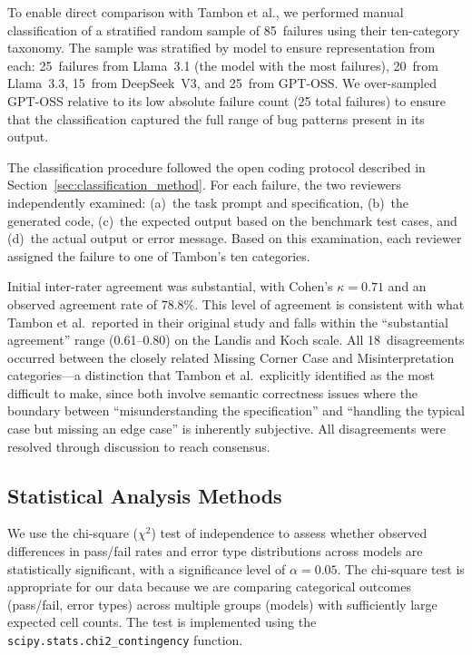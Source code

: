 \documentclass[smallextended]{svjour3}
\begin{document}
To enable direct comparison with Tambon et al., we performed manual classification of a stratified random sample of 85~failures using their ten-category taxonomy. The sample was stratified by model to ensure representation from each: 25~failures from Llama~3.1 (the model with the most failures), 20~from Llama~3.3, 15~from DeepSeek~V3, and 25~from GPT-OSS. We over-sampled GPT-OSS relative to its low absolute failure count (25 total failures) to ensure that the classification captured the full range of bug patterns present in its output.

The classification procedure followed the open coding protocol described in Section~\ref{sec:classification_method}. For each failure, the two reviewers independently examined: (a)~the task prompt and specification, (b)~the generated code, (c)~the expected output based on the benchmark test cases, and (d)~the actual output or error message. Based on this examination, each reviewer assigned the failure to one of Tambon's ten categories.

Initial inter-rater agreement was substantial, with Cohen's $\kappa = 0.71$ and an observed agreement rate of 78.8\%. This level of agreement is consistent with what Tambon et al.\ reported in their original study and falls within the ``substantial agreement'' range (0.61--0.80) on the Landis and Koch scale. All 18~disagreements occurred between the closely related Missing Corner Case and Misinterpretation categories---a distinction that Tambon et al.\ explicitly identified as the most difficult to make, since both involve semantic correctness issues where the boundary between ``misunderstanding the specification'' and ``handling the typical case but missing an edge case'' is inherently subjective. All disagreements were resolved through discussion to reach consensus.

\subsection{Statistical Analysis Methods}
\label{sec:stats}

We use the chi-square ($\chi^2$) test of independence \citep{mchugh2013chi} to assess whether observed differences in pass/fail rates and error type distributions across models are statistically significant, with a significance level of $\alpha = 0.05$. The chi-square test is appropriate for our data because we are comparing categorical outcomes (pass/fail, error types) across multiple groups (models) with sufficiently large expected cell counts. The test is implemented using the \texttt{scipy.stats.chi2\_contingency} function.
\end{document}
